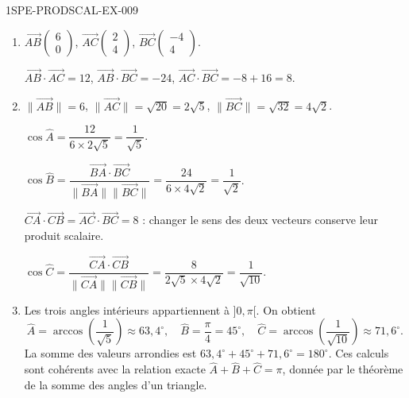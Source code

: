 \begin{corrige}{1SPE-PRODSCAL-EX-009}
\begin{enumerate}
\item $\overrightarrow{AB}\begin{pmatrix} 6 \\ 0 \end{pmatrix}$, $\overrightarrow{AC}\begin{pmatrix} 2 \\ 4 \end{pmatrix}$, $\overrightarrow{BC}\begin{pmatrix} -4 \\ 4 \end{pmatrix}$.

$\overrightarrow{AB} \cdot \overrightarrow{AC} = 12$, $\overrightarrow{AB} \cdot \overrightarrow{BC} = -24$, $\overrightarrow{AC} \cdot \overrightarrow{BC} = -8 + 16 = 8$.

\item $\|\overrightarrow{AB}\| = 6$, $\|\overrightarrow{AC}\| = \sqrt{20} = 2\sqrt{5}$, $\|\overrightarrow{BC}\| = \sqrt{32} = 4\sqrt{2}$.

$\cos\widehat{A} = \dfrac{12}{6 \times 2\sqrt{5}} = \dfrac{1}{\sqrt{5}}$.

$\cos\widehat{B} = \dfrac{\overrightarrow{BA} \cdot \overrightarrow{BC}}{\|\overrightarrow{BA}\| \|\overrightarrow{BC}\|} = \dfrac{24}{6 \times 4\sqrt{2}} = \dfrac{1}{\sqrt{2}}$.

$\overrightarrow{CA}\cdot\overrightarrow{CB}
=\overrightarrow{AC}\cdot\overrightarrow{BC}=8$ : changer le sens des deux vecteurs conserve leur produit scalaire.

$\cos\widehat{C} = \dfrac{\overrightarrow{CA} \cdot \overrightarrow{CB}}{\|\overrightarrow{CA}\| \|\overrightarrow{CB}\|} = \dfrac{8}{2\sqrt{5} \times 4\sqrt{2}} = \dfrac{1}{\sqrt{10}}$.

\item Les trois angles intérieurs appartiennent à $]0,\pi[$. On obtient
\[
\widehat A=\arccos\left(\frac1{\sqrt5}\right)\approx63{,}4^\circ,
\quad \widehat B=\frac\pi4=45^\circ,
\quad \widehat C=\arccos\left(\frac1{\sqrt{10}}\right)\approx71{,}6^\circ.
\]
La somme des valeurs arrondies est $63{,}4^\circ+45^\circ+71{,}6^\circ=180^\circ$.
Ces calculs sont cohérents avec la relation exacte
$\widehat A+\widehat B+\widehat C=\pi$, donnée par le théorème de la somme des angles d'un triangle.
\end{enumerate}
\end{corrige}
